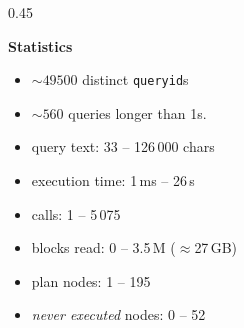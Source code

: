\documentclass{beamer}
\begin{document}
\begin{frame}[fragile]
\begin{columns}[T]
\begin{column}{0.45\textwidth}
\begin{center}
	{\scriptsize\textbf{Statistics}}
\end{center}
\par\vspace{2pt}
{\scriptsize
\begin{itemize}\itemsep2pt
 \item $\sim49500$ distinct \texttt{queryid}s
 \item $\sim560$ queries longer than 1s.
 \item query text: 33 -- 126\,000 chars
 \item execution time: 1\,ms -- 26\,s
 \item calls: 1 -- 5\,075
 \item blocks read: 0 -- 3.5\,M ($\approx$27\,GB)
 \item plan nodes: 1 -- 195
 \item \emph{never executed} nodes: 0 -- 52
\end{itemize}
}
\end{column}

\end{columns}
\end{frame}


\end{document}

